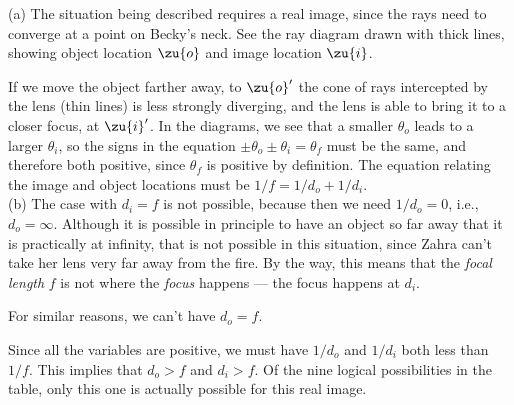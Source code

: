 (a) The situation being described requires a real image, since the rays need
to converge at a point on Becky's neck.
See the ray diagram drawn with thick lines, showing object location $\zu{o}$
and image location $\zu{i}$.


If we move the object farther away, to $\zu{o}'$ the cone of rays
intercepted by the lens (thin lines) is less strongly diverging, and the
lens is able to bring it to a closer focus, at $\zu{i}'$. In the diagrams,
we see that a smaller $\theta_o$ leads to a larger
$\theta_i$, so the signs in the equation $\pm\theta_o\pm\theta_i=\theta_f$ must be the same, and
therefore both positive, since $\theta_f$ is positive by definition.
The equation relating the image and object locations must be
 $1/f=1/d_o+1/d_i$.\\

(b) The case with $d_i=f$ is not possible, because then we need $1/d_o=0$,
i.e., $d_o=\infty$. Although it is possible in principle to have an object
so far away that it is practically at infinity, that is not possible in
this situation, since Zahra can't take her lens very far away from the fire.
By the way, this means that the \emph{focal length} $f$ is not where the
\emph{focus} happens --- the focus happens at $d_i$.

For similar reasons, we can't have $d_o=f$.

Since all the variables are positive, we must have $1/d_o$ and
$1/d_i$ both less than $1/f$. This implies that $d_o>f$ and
$d_i>f$. Of the nine logical possibilities in the table, only
this one is actually possible for this real image.
